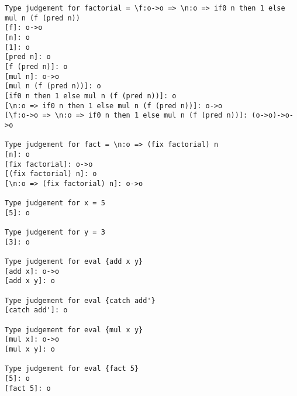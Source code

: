 \documentclass[12pt,a4paper]{report}
\theoremstyle{definition}
\theoremstyle{remark}
\begin{document}
\begin{verbatim}
Type judgement for factorial = \f:o->o => \n:o => if0 n then 1 else mul n (f (pred n))
[f]: o->o
[n]: o
[1]: o
[pred n]: o
[f (pred n)]: o
[mul n]: o->o
[mul n (f (pred n))]: o
[if0 n then 1 else mul n (f (pred n))]: o
[\n:o => if0 n then 1 else mul n (f (pred n))]: o->o
[\f:o->o => \n:o => if0 n then 1 else mul n (f (pred n))]: (o->o)->o->o

Type judgement for fact = \n:o => (fix factorial) n
[n]: o
[fix factorial]: o->o
[(fix factorial) n]: o
[\n:o => (fix factorial) n]: o->o

Type judgement for x = 5
[5]: o

Type judgement for y = 3
[3]: o

Type judgement for eval {add x y}
[add x]: o->o
[add x y]: o

Type judgement for eval {catch add'}
[catch add']: o

Type judgement for eval {mul x y}
[mul x]: o->o
[mul x y]: o

Type judgement for eval {fact 5}
[5]: o
[fact 5]: o
\end{verbatim}
\end{document}
